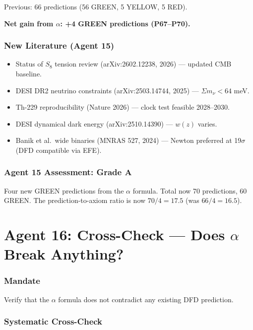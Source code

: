 \documentclass[11pt,a4paper]{article}
\begin{document}
Previous: 66 predictions (56 GREEN, 5 YELLOW, 5 RED).

\textbf{Net gain from $\alpha$: +4 GREEN predictions (P67--P70).}

\section{New Literature (Agent 15)}

\begin{itemize}
\item Status of $S_8$ tension review (arXiv:2602.12238, 2026) --- updated CMB baseline.
\item DESI DR2 neutrino constraints (arXiv:2503.14744, 2025) --- $\Sigma m_\nu < 64$ meV.
\item Th-229 reproducibility (Nature 2026) --- clock test feasible 2028--2030.
\item DESI dynamical dark energy (arXiv:2510.14390) --- $w(z)$ varies.
\item Banik et al.\ wide binaries (MNRAS 527, 2024) --- Newton preferred at 19$\sigma$ (DFD compatible via EFE).
\end{itemize}

\section{Agent 15 Assessment: Grade A}

Four new GREEN predictions from the $\alpha$ formula. Total now 70 predictions, 60 GREEN. The prediction-to-axiom ratio is now $70/4 = 17.5$ (was $66/4 = 16.5$).


\part{Agent 16: Cross-Check --- Does $\alpha$ Break Anything?}
\label{part:agent16}

\section{Mandate}
Verify that the $\alpha$ formula does not contradict any existing DFD prediction.

\section{Systematic Cross-Check}
\end{document}
